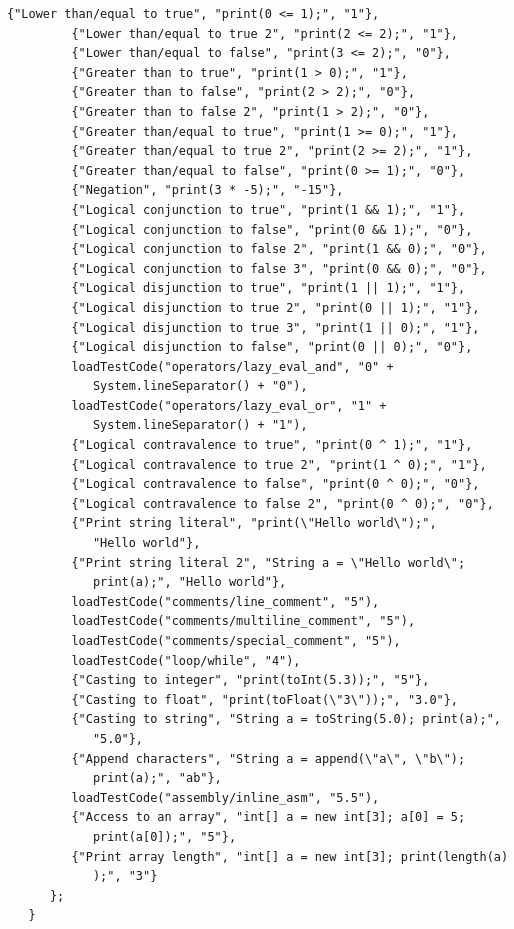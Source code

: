 \begin{lstlisting}[frame=htrbl, caption={Implementation of {\ttfamily CompilerTest.java}}, label={lst:compiler_test}, basicstyle=\footnotesize]
         {"Lower than/equal to true", "print(0 <= 1);", "1"},
         {"Lower than/equal to true 2", "print(2 <= 2);", "1"},
         {"Lower than/equal to false", "print(3 <= 2);", "0"},
         {"Greater than to true", "print(1 > 0);", "1"},
         {"Greater than to false", "print(2 > 2);", "0"},
         {"Greater than to false 2", "print(1 > 2);", "0"},
         {"Greater than/equal to true", "print(1 >= 0);", "1"},
         {"Greater than/equal to true 2", "print(2 >= 2);", "1"},
         {"Greater than/equal to false", "print(0 >= 1);", "0"},
         {"Negation", "print(3 * -5);", "-15"},
         {"Logical conjunction to true", "print(1 && 1);", "1"},
         {"Logical conjunction to false", "print(0 && 1);", "0"},
         {"Logical conjunction to false 2", "print(1 && 0);", "0"},
         {"Logical conjunction to false 3", "print(0 && 0);", "0"},
         {"Logical disjunction to true", "print(1 || 1);", "1"},
         {"Logical disjunction to true 2", "print(0 || 1);", "1"},
         {"Logical disjunction to true 3", "print(1 || 0);", "1"},
         {"Logical disjunction to false", "print(0 || 0);", "0"},
         loadTestCode("operators/lazy_eval_and", "0" + 
            System.lineSeparator() + "0"),
         loadTestCode("operators/lazy_eval_or", "1" + 
            System.lineSeparator() + "1"),
         {"Logical contravalence to true", "print(0 ^ 1);", "1"},
         {"Logical contravalence to true 2", "print(1 ^ 0);", "1"},
         {"Logical contravalence to false", "print(0 ^ 0);", "0"},
         {"Logical contravalence to false 2", "print(0 ^ 0);", "0"},
         {"Print string literal", "print(\"Hello world\");", 
            "Hello world"},
         {"Print string literal 2", "String a = \"Hello world\"; 
            print(a);", "Hello world"},
         loadTestCode("comments/line_comment", "5"),
         loadTestCode("comments/multiline_comment", "5"),
         loadTestCode("comments/special_comment", "5"),
         loadTestCode("loop/while", "4"),
         {"Casting to integer", "print(toInt(5.3));", "5"},
         {"Casting to float", "print(toFloat(\"3\"));", "3.0"},
         {"Casting to string", "String a = toString(5.0); print(a);", 
            "5.0"},
         {"Append characters", "String a = append(\"a\", \"b\"); 
            print(a);", "ab"},
         loadTestCode("assembly/inline_asm", "5.5"),
         {"Access to an array", "int[] a = new int[3]; a[0] = 5; 
            print(a[0]);", "5"},
         {"Print array length", "int[] a = new int[3]; print(length(a)
            );", "3"}
      };
   }
   

\end{lstlisting}
